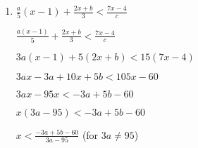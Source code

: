 \documentclass[10pt]{exam}
\begin{document}
\begin{multicols*}{2}
\begin{enumerate}
\item \( \displaystyle \frac{a}{5}(x - 1) + \frac{2x + b}{3} < \frac{7x - 4}{c} \)

\( \displaystyle \frac{a(x - 1)}{5} + \frac{2x + b}{3} < \frac{7x - 4}{c} \)

\( \displaystyle 3a(x - 1) + 5(2x + b) < 15(7x - 4) \)

\( \displaystyle 3ax - 3a + 10x + 5b < 105x - 60 \)

\( \displaystyle 3ax - 95x < -3a + 5b - 60 \)

\( \displaystyle x(3a - 95) < -3a + 5b - 60 \)

\( \displaystyle x < \frac{-3a + 5b - 60}{3a - 95} \) (for \( 3a \neq 95 \))

\end{enumerate}
\end{multicols*}
\end{document}
